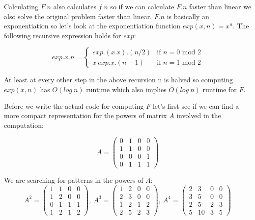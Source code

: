Calculating $F.n$ also calculates $f.n$ so if we can calculate $F.n$ faster than linear we also solve the original problem faster than linear. $F.n$ is basically an exponentiation so let's look at the exponentiation function $exp(x, n) = x^n$. The following recursive expression holds for $exp$:

\begin{equation*}
 exp.x.n = 
 \begin{cases}
 exp. (x \ x).(n / 2) & \text{if } n = 0 \text{ mod } 2 \\
 x \ exp.x.(n - 1) & \text{if }n = 1 \text{ mod } 2 
 \end{cases}
\end{equation*}

At least at every other step in the above recursion n is halved so computing $exp(x, n)$ has $O(log\ n)$ runtime which also implies $O(log\ n)$ runtime for $F$.

Before we write the actual code for computing $F$ let's first see if we can find a more compact representation for the powers of matrix $A$ involved in the computation:

\begin{equation*}
A = 
\begin{pmatrix}
       0 & 1 & 0 & 0\\
       1 & 1 & 0 & 0\\
       0 & 0 & 0 & 1\\
       0 & 1 & 1 & 1
       \end{pmatrix}
\end{equation*}

We are searching for patterns in the powers of $A$:
\begin{equation*}
A^2 = 
\begin{pmatrix}
       1 & 1 & 0 & 0\\
       1 & 2 & 0 & 0\\
       0 & 1 & 1 & 1\\
       1 & 2 & 1 & 2
       \end{pmatrix},\ A^3 =
 \begin{pmatrix}
       1 & 2 & 0 & 0\\
       2 & 3 & 0 & 0\\
       1 & 2 & 1 & 2\\
       2 & 5 & 2 & 3
       \end{pmatrix},\ A^4 =
 \begin{pmatrix}
       2 & 3 & 0 & 0\\
       3 & 5& 0 & 0\\
       2 & 5 & 2 & 3\\
       5 & 10 & 3 & 5
       \end{pmatrix}
\end{equation*}

